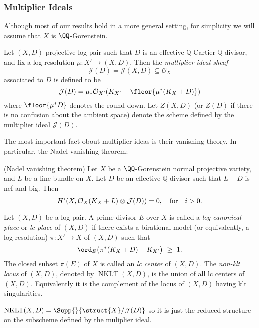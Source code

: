 \documentclass[12pt]{article}
\theoremstyle{plain}
\DeclareMathOperator{\NKLT}{NKLT}
\newcommand{\mb}[1]{\mathbb{#1}}
\begin{document}
\subsubsection{Multiplier Ideals}

Although most of our results hold in a more general setting, for simplicity we will assume that $X$ is $\QQ$-Gorenstein.

\newcommand{\mtc}[1]{\mathcal{#1}}

\begin{defn}\textup{
    Let $(X,D)$ projective log pair such that $D$ is an effective $\mb{Q}$-Cartier $\mb{Q}$-divisor, and fix a log resolution $\mu : X' \rightarrow (X,D)$. Then the \emph{multiplier ideal sheaf}
    \[ \mtc{J}(D) = \mtc{J}(X,D)\subseteq \mtc{O}_X \]
    associated to $D$ is defined to be
    \[ \mtc{J}(D)=\mu_{*}\mtc{O}_{X'}(K_{X'}-\floor{\mu^{*}(K_X + D)}) \]
    where $\floor{\mu^{\ast}D}$ denotes the round-down. Let $Z(X,D)$ (or $Z(D)$ if there is no confusion about the ambient space) denote the scheme defined by the multiplier ideal $\mtc{J}(D)$.
}
\end{defn}

The most important fact obout multiplier ideas is their vanishing theory. In particular, the Nadel vanishing theorem:

\begin{theorem}\label{nadel} \textup{(Nadel vanishing theorem)}
Let $X$ be a $\QQ$-Gorenstein normal projective variety, and $L$ be a line bundle on $X$. Let $D$ be an effective $\mb{Q}$-divisor such that $L-D$ is nef and big. Then
\[ H^i(X,\mtc{O}_X(K_X+L)\otimes \mtc{J}(D))=0,\quad \textup{for}\quad i>0. \]
\end{theorem}

\begin{defn}\label{nonklt}\textup{
    Let $(X,D)$ be a log pair. A prime divisor $E$ over $X$ is called a \emph{log canonical place} or \textit{lc place} of $(X,D)$ if there exists a birational model (or equivalently, a log resolution) $\pi:X'\rightarrow X$ of $(X,D)$ such that
    \[ \ord_{E}\big(\pi^{*}(K_X+D)-K_{X'}\big)\ \ge \ 1. \]
The closed subset $\pi(E)$ of $X$ is called an \emph{lc center} of $(X,D)$. The \emph{non-klt locus} of $(X,D)$, denoted by $\NKLT(X,D)$, is the union of all lc centers of $(X,D)$. Equivalently it is the complement of the locus of $(X, D)$ having klt singularities.
}\end{defn}

\begin{rmk}
$\NKLT(X,D) = \Supp{}{\struct{X} / \mtc{J}(D)}$ so it is just the reduced structure on the subscheme defined by the muliplier ideal.
\end{rmk}
\end{document}
